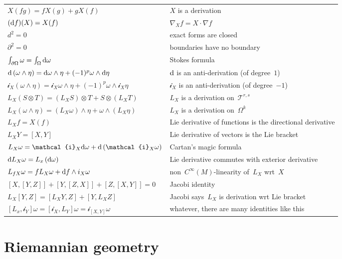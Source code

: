 \begin{tabular}{l|l}
	\hline
	$X(fg)=fX(g)+gX(f)$ & $X$ is a derivation \\
	$(\mathrm{d} f)(X)=X(f)$ & $\nabla_Xf=X\cdot \nabla f$\\
	$d^2=0$ & exact forms are closed \\
	$\partial^2=0$ & boundaries have no boundary \\
	$\int_{\partial\Omega}\omega=\int_\Omega\mathrm{d}\omega$ & Stokes formula \\
	$\mathrm{d}\left(\omega\wedge\eta\right)=
	\mathrm{d}\omega\wedge\eta+(-1)^p\omega\wedge\mathrm{d}\eta$ &
	$\mathrm{d}$ is an anti-derivation (of degree~$1$)\\
	$\mathcal{i}_X\left(\omega\wedge\eta\right)=
	\mathcal{i}_X\omega\wedge\eta+(-1)^p\omega\wedge\mathcal{i}_X\eta$
	& $\mathcal{i}_X$ is an anti-derivation (of degree~$-1$)\\
	$L_X\left(S\otimes T\right)=
	\left(L_XS\right)\otimes T
	+
	S\otimes\left(L_XT\right)
	$ & $L_X$ is a derivation on~$\mathcal{T}^{r,s}$\\
	$L_X\left(\omega\wedge\eta\right)=
	\left(L_X\omega\right)\wedge\eta
	+
	\omega\wedge\left(L_X\eta\right)
	$ & $L_X$ is a derivation on~$\Omega^k$\\
	$L_Xf=X(f)$ & Lie derivative of functions is the directional derivative\\
	$L_XY=[X,Y]$ & Lie derivative of vectors is the Lie bracket\\
	$L_X\omega=\mathcal{i}_X\ud\omega+\ud\left(\mathcal{i}_X\omega\right)$ &
	Cartan's magic formula \\
	$\mathrm{d} L_X\omega=L_x\left(\mathrm{d}\omega\right)$ &
	Lie derivative commutes with exterior derivative\\
	$L_{fX}\omega=fL_X\omega+\mathrm{d} f\wedge i_X\omega$ &
	non~$C^\infty(M)$-linearity of~$L_X$ wrt~$X$\\
	$[X,[Y,Z]]+[Y,[Z,X]]+[Z,[X,Y]]=0$ & Jacobi identity\\
	$L_X[Y,Z]=[L_XY,Z]+[Y,L_XZ]$ &
	Jacobi says~$L_X$ is derivation wrt Lie bracket\\
	$[L_x,\mathcal{i}_Y]\omega=
	[\mathcal{i}_X,L_Y]\omega=
	\mathcal{i}_{[X,Y]}\omega$ & whatever, there are many identities like this\\
\end{tabular}



\clearpage
\section{Riemannian geometry}


